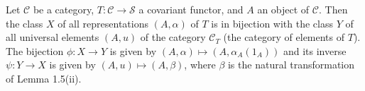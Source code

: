Let $\mathcal{C}$ be a category, $T : \mathcal{C} \to \mathcal{S}$ a covariant functor, and $A$ an object of $\mathcal{C}$. Then the class $X$ of all representations $(A, \alpha)$ of $T$ is in bijection with the class $Y$ of all universal elements $(A, u)$ of the category $\mathcal{C}_T$ (the category of elements of $T$). The bijection $\phi : X \to Y$ is given by $(A, \alpha) \mapsto (A, \alpha_A(1_A))$ and its inverse $\psi : Y \to X$ is given by $(A, u) \mapsto (A, \beta)$, where $\beta$ is the natural transformation of Lemma 1.5(ii).
